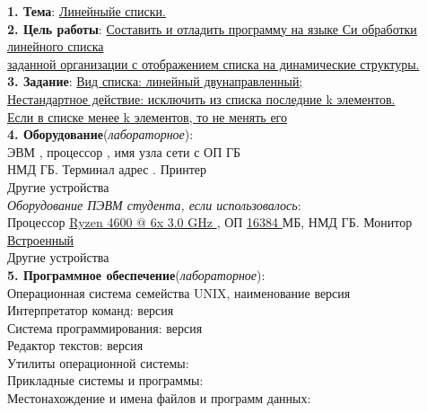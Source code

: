 \documentclass[10pt]{report}
\begin{document}
    \begin{spacing}{1}
        \indent \textbf{1. Тема}: \underline{Линейныйе списки.}\\               %
        \indent \textbf{2. Цель работы}: \underline{Составить и отладить программу на языке Си обработки линейного списка } \\
        \indent \underline{заданной организации с отображением списка на динамические структуры.} \\   %
        \indent \textbf{3. Задание}: \underline{Вид списка: линейный двунаправленный;}\\
        \indent \underline{Нестандартное действие: исключить из списка последние k элементов. }\\
        \indent \underline{Если в списке менее k элементов, то не менять его}\\  %
        \indent \textbf{4. Оборудование}(\textit{лабораторное}):  \\ 
        \indent ЭВМ \tlinee{0.5in}, процессор \tlinee{0.7in}, имя узла сети \tlinee{0.3in} с ОП \tlinee{0.2in} ГБ\\
        \indent НМД \tlinee{0.5in} ГБ. Терминал \tlinee{0.7in} адрес \tlinee{0.7in}. Принтер \tlinee{0.7in}\\
        \indent Другие устройства \tlinee{2.5in} \\
        \indent \textit{Оборудование ПЭВМ студента, если использовалось}:  \\ 
        \indent Процессор \underline{ Ryzen 4600 @ 6x 3.0 GHz }, ОП \underline{ 16384 } МБ, НМД \tlinee{0.5in}ГБ. Монитор \underline{ Встроенный }\\
        \indent Другие устройства \tlinee{2.5in} \\

        \indent \textbf{5. Программное обеспечение}(\textit{лабораторное}):  \\ 
        \indent Операционная система семейства UNIX, наименование \underline{\hspace{0.5in}} версия \underline{\hspace{0.5in}}\\
        \indent Интерпретатор  команд: \underline{\hspace{2in}} версия \tlinee{0.5in}\\
        \indent Система программирования: \tlinee{2in} версия \tlinee{0.5in}\\
        \indent Редактор текстов: \tlinee{2in} версия \tlinee{0.5in}\\
        \indent Утилиты операционной системы: \tlinee{4in}\\
        \indent Прикладные системы и программы: \tlinee{3.7in}\\
        \indent Местонахождение и имена файлов и программ данных: \tlinee{2.2in}\\


\end{spacing}
\end{document}
